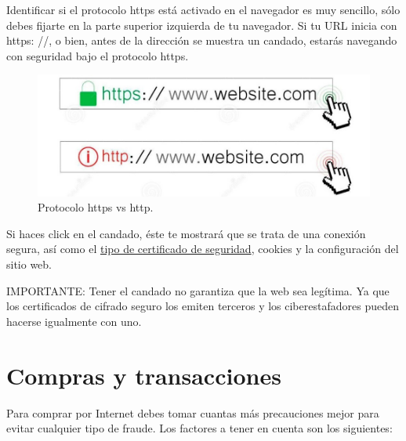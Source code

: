 \documentclass[
  spanish,
  a4paper,
  openany]{book}
\begin{document}
Identificar si el protocolo https está activado en el navegador es muy sencillo, sólo debes fijarte en la parte superior izquierda de tu navegador. Si tu URL inicia con https: //, o bien, antes de la dirección se muestra un candado, estarás navegando con seguridad bajo el protocolo https.

\begin{figure}

{\centering \includegraphics[width=0.75\linewidth]{images/protocolo-https-http} 

}

\caption{Protocolo https vs http.}\label{fig:unnamed-chunk-10}
\end{figure}

Si haces click en el candado, éste te mostrará que se trata de una conexión segura, así como el \href{https://www.softrending.com/blog/hosting/tipos-diferencias-certificado-seguridad-ssl}{tipo de certificado de seguridad}, cookies y la configuración del sitio web.

IMPORTANTE: Tener el candado no garantiza que la web sea legítima. Ya que los certificados de cifrado seguro los emiten terceros y los ciberestafadores pueden hacerse igualmente con uno.

\hypertarget{compras-y-transacciones}{%
\section{Compras y transacciones}\label{compras-y-transacciones}}

Para comprar por Internet debes tomar cuantas más precauciones mejor para evitar cualquier tipo de fraude. Los factores a tener en cuenta son los siguientes:
\end{document}

